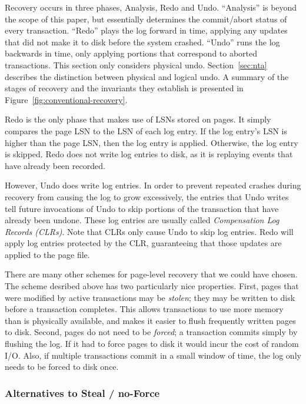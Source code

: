 \documentclass[letterpaper,twocolumn,10pt]{article}
\begin{document}
Recovery occurs in three phases, Analysis, Redo and Undo.
``Analysis'' is beyond the scope of this paper, but essentially determines the commit/abort status of every transaction.  ``Redo'' plays the
log forward in time, applying any updates that did not make it to disk
before the system crashed.  ``Undo'' runs the log backwards in time,
only applying portions that correspond to aborted transactions.  This
section only considers physical undo.  Section~\ref{sec:nta} describes
the distinction between physical and logical undo.
A summary of the stages of recovery and the invariants
they establish is presented in Figure~\ref{fig:conventional-recovery}.

Redo is the only phase that makes use of LSNs stored on pages.
It simply compares the page LSN to the LSN of each log entry.  If the
log entry's LSN is higher than the page LSN, then the log entry is
applied.  Otherwise, the log entry is skipped.  Redo does not write
log entries to disk, as it is replaying events that have already been
recorded.  

However, Undo does write log entries.  In order to prevent repeated
crashes during recovery from causing the log to grow excessively, the
entries that Undo writes tell future invocations of Undo to skip
portions of the transaction that have already been undone.  These log
entries are usually called {\em Compensation Log Records (CLRs)}.
Note that CLRs only cause Undo to skip log entries.  Redo will apply
log entries protected by the CLR, guaranteeing that those updates are
applied to the page file.

There are many other schemes for page-level recovery that we could
have chosen.  The scheme desribed above has two particularly nice
properties.  First, pages that were modified by active transactions
may be {\em stolen}; they may be written to disk before a transaction
completes.  This allows transactions to use more memory than is
physically available, and makes it easier to flush frequently written
pages to disk.  Second, pages do not need to be {\em forced}; a
transaction commits simply by flushing the log.  If it had to force
pages to disk it would incur the cost of random I/O.  Also, if
multiple transactions commit in a small window of time, the log only
needs to be forced to disk once.

\subsubsection{Alternatives to Steal / no-Force}
\end{document}
